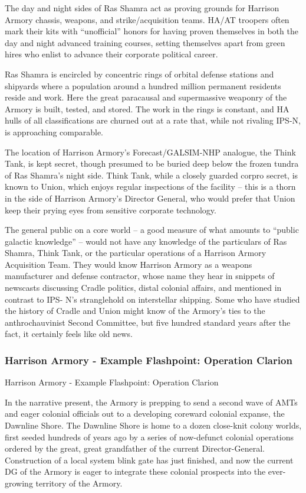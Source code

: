 The day and night sides of Ras Shamra act as proving grounds for Harrison Armory chassis,
weapons, and strike/acquisition teams. HA/AT troopers often mark their kits with “unofficial”
honors for having proven themselves in both the day and night advanced training courses,
setting themselves apart from green hires who enlist to advance their corporate political career.


Ras Shamra is encircled by concentric rings of orbital defense stations and shipyards where a
population around a hundred million permanent residents reside and work. Here the great
paracausal and supermassive weaponry of the Armory is built, tested, and stored. The work in
the rings is constant, and HA hulls of all classifications are churned out at a rate that, while not
rivaling IPS-N, is approaching comparable.


The location of Harrison Armory’s Forecast/GALSIM-NHP analogue, the Think Tank, is kept
secret, though presumed to be buried deep below the frozen tundra of Ras Shamra’s night side.
Think Tank, while a closely guarded corpro secret, is known to Union, which enjoys regular
inspections of the facility -- this is a thorn in the side of Harrison Armory’s Director General, who
would prefer that Union keep their prying eyes from sensitive corporate technology.


The general public on a core world -- a good measure of what amounts to “public galactic
knowledge” -- would not have any knowledge of the particulars of Ras Shamra, Think Tank, or
the particular operations of a Harrison Armory Acquisition Team. They would know Harrison
Armory as a weapons manufacturer and defense contractor, whose name they hear in snippets
of newscasts discussing Cradle politics, distal colonial affairs, and mentioned in contrast to IPS-
N’s stranglehold on interstellar shipping. Some who have studied the history of Cradle and Union
might know of the Armory’s ties to the anthrochauvinist Second Committee, but five hundred
standard years after the fact, it certainly feels like old news.

\subsubsection{Harrison Armory - Example Flashpoint: Operation Clarion  }
Harrison Armory - Example Flashpoint: Operation Clarion

In the narrative present, the Armory is prepping to send a second wave of AMTs and eager
colonial officials out to a developing coreward colonial expanse, the Dawnline Shore. The
Dawnline Shore is home to a dozen close-knit colony worlds, first seeded hundreds of years ago
by a series of now-defunct colonial operations ordered by the great, great grandfather of the
current Director-General. Construction of a local system blink gate has just finished, and now the
current DG of the Armory is eager to integrate these colonial prospects into the ever-growing
territory of the Armory.





